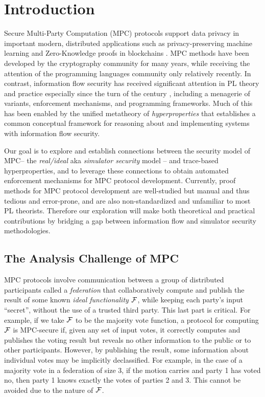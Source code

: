 \section{Introduction}

Secure Multi-Party Computation (MPC) protocols support data privacy in
important modern, distributed applications such as privacy-preserving
machine learning and Zero-Knowledge proofs in blockchains \cite{XXX}
. MPC methods
have been developed by the cryptography community for many years,
while receiving the attention of the programming languages community
only relatively recently. In contrast, information flow security has
received significant attention in PL theory and practice especially
since the turn of the century \cite{1159651}, including a menagerie of
variants, enforcement mechanisms, and programming frameworks. Much of
this has been enabled by the unified metatheory of
\emph{hyperproperties} \cite{10.5555/1891823.1891830} that establishes
a common conceptual framework for reasoning about and implementing
systems with information flow security.

Our goal is to explore and establish connections between the security
model of MPC-- the \emph{real/ideal} aka \emph{simulator security}
model -- and trace-based hyperproperties, and to leverage these
connections to obtain automated enforcement mechanisms for MPC
protocol development. Currently, proof methods for MPC protocol
development are well-studied \cite{Lindell2017} but manual and 
thus tedious and error-prone, and are also non-standardized and
unfamiliar to most PL theorists. Therefore our exploration will
make both theoretical and practical contributions by bridging a gap between
information flow and simulator security methodologies.

\subsection{The Analysis Challenge of MPC} MPC protocols involve communication
between a group of distributed participants called a \emph{federation}
that collaboratively compute and publish the result of some known
\emph{ideal functionality} $\mathcal{F}$, while keeping each party's input
``secret'', without the use of a trusted third party. This last part
is critical. For example, if we take $\mathcal{F}$ to be the majority vote
function, a protocol for computing $\mathcal{F}$ is MPC-secure if, given
any set of input votes, it correctly computes and publishes the voting
result but reveals no other information to the public or to other
participants. However, by publishing the result, some information
about individual votes may be implicitly declassified.  For example,
in the case of a majority vote in a federation of size 3, if the
motion carries and party 1 has voted no, then party 1 knows exactly
the votes of parties 2 and 3. This cannot be avoided due to the nature
of $\mathcal{F}$.

